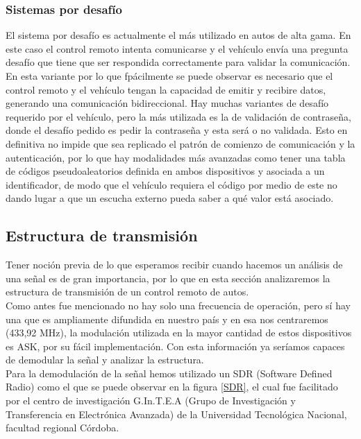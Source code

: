 \documentclass[12pt]{report}
\begin{document}
\subsubsection{Sistemas por desafío}

El sistema por desafío es actualmente el más utilizado en autos de alta gama. En este caso el control remoto intenta comunicarse y
el vehículo envía una pregunta desafío que tiene que ser respondida correctamente para validar la comunicación.\\
En esta variante por lo que fpácilmente se puede observar es necesario que el control remoto y el vehículo tengan la capacidad de
emitir y recibire datos, generando una comunicación bidireccional.
Hay muchas variantes de desafío requerido por el vehículo, pero la más utilizada es la de validación de contraseña, donde el desafío pedido
es pedir la contraseña y esta será o no validada. Esto en definitiva no impide que sea replicado el patrón de comienzo de comunicación y 
la autenticación, por lo que hay modalidades más avanzadas como tener una tabla de códigos pseudoaleatorios definida en ambos dispositivos
y asociada a un identificador, de modo que el vehículo requiera el código por medio de este no dando lugar a que un escucha externo pueda saber
a qué valor está asociado.

\subsection{Estructura de transmisión}

Tener noción previa de lo que esperamos recibir cuando hacemos un análisis de una señal es de gran importancia, por lo que en esta sección 
analizaremos la estructura de transmisión de un control remoto de autos.\\
Como antes fue mencionado no hay solo una frecuencia de operación, pero sí hay una que es ampliamente difundida en nuestro país y en esa nos 
centraremos (433,92 MHz), la modulación utilizada en la mayor cantidad de estos dispositivos es ASK, por su fácil implementación. Con esta
información ya seríamos capaces de demodular la señal y analizar la estructura.\\ 
Para la demodulación de la señal hemos utilizado un SDR (Software Defined Radio) como el que se puede observar en la figura \ref{SDR}, el cual
fue facilitado por el centro de investigación G.In.T.E.A (Grupo de Investigación y Transferencia en Electrónica Avanzada) de la Universidad
Tecnológica Nacional, facultad regional Córdoba.\\
\end{document}
